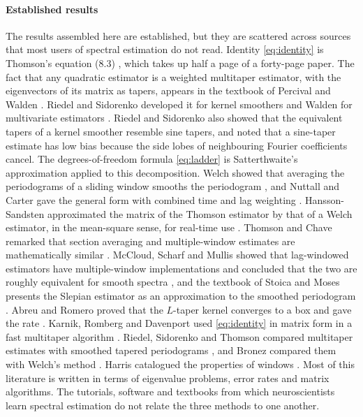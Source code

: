\documentclass[10pt,twocolumn]{article}
\begin{document}
\paragraph{Established results} The results assembled here are established, but they are scattered across sources that most users of spectral estimation do not read. Identity \eqref{eq:identity} is Thomson's equation (8.3) \cite{thomson1982}, which takes up half a page of a forty-page paper. The fact that any quadratic estimator is a weighted multitaper estimator, with the eigenvectors of its matrix as tapers, appears in the textbook of Percival and Walden \cite{percival1993}. Riedel and Sidorenko developed it for kernel smoothers \cite{riedel1995} and Walden for multivariate estimators \cite{walden2000}. Riedel and Sidorenko also showed that the equivalent tapers of a kernel smoother resemble sine tapers, and noted that a sine-taper estimate has low bias because the side lobes of neighbouring Fourier coefficients cancel. The degrees-of-freedom formula \eqref{eq:ladder} is Satterthwaite's approximation \cite{satterthwaite1946} applied to this decomposition. Welch showed that averaging the periodograms of a sliding window smooths the periodogram \cite{welch1967}, and Nuttall and Carter gave the general form with combined time and lag weighting \cite{nuttall1982}. Hansson-Sandsten approximated the matrix of the Thomson estimator by that of a Welch estimator, in the mean-square sense, for real-time use \cite{hansson2012}. Thomson and Chave remarked that section averaging and multiple-window estimates are mathematically similar \cite{thomson1991}. McCloud, Scharf and Mullis showed that lag-windowed estimators have multiple-window implementations and concluded that the two are roughly equivalent for smooth spectra \cite{mccloud1999}, and the textbook of Stoica and Moses presents the Slepian estimator as an approximation to the smoothed periodogram \cite{stoica2005}. Abreu and Romero proved that the $L$-taper kernel converges to a box and gave the rate \cite{abreu2017}. Karnik, Romberg and Davenport used \eqref{eq:identity} in matrix form in a fast multitaper algorithm \cite{karnik2022}. Riedel, Sidorenko and Thomson compared multitaper estimates with smoothed tapered periodograms \cite{riedel1994}, and Bronez compared them with Welch's method \cite{bronez1992}. Harris catalogued the properties of windows \cite{harris1978}. Most of this literature is written in terms of eigenvalue problems, error rates and matrix algorithms. The tutorials, software and textbooks from which neuroscientists learn spectral estimation \cite{mitra1999,bokil2010,babadi2014,prerau2017,kay1988} do not relate the three methods to one another.
\end{document}
